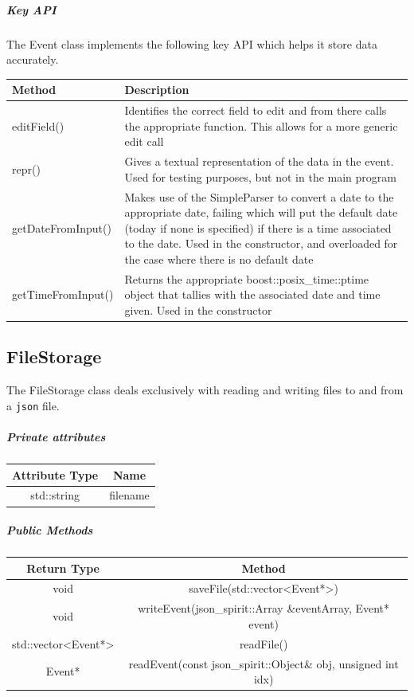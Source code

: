\documentclass[12pt]{extarticle}
\begin{document}
\subparagraph{Key API}
The Event class implements the following key API which helps it store data accurately.\\
\begin{tabular}{p{6cm} p{12cm}}
Method & Description\\
\hline
editField() & Identifies the correct field to edit and from there calls the appropriate function. This allows for a more generic edit call\\
repr() & Gives a textual representation of the data in the event. Used for testing purposes, but not in the main program\\
getDateFromInput() & Makes use of the SimpleParser to convert a date to the appropriate date, failing which will put the default date (today if none is specified) if there is a time associated to the date. Used in the constructor, and overloaded for the case where there is no default date\\
getTimeFromInput() & Returns the appropriate boost::posix\_time::ptime object that tallies with the associated date and time given. Used in the constructor\\
\end{tabular}

\subsection{FileStorage}
The FileStorage class deals exclusively with reading and writing files to and from a \texttt{json} file.
\subparagraph{Private attributes}
\begin{tabular}{c c}
Attribute Type & Name\\
\hline
std::string & filename\\
\end{tabular}

\subparagraph{Public Methods}
\begin{tabular}{c c}
Return Type & Method\\
\hline
void & saveFile(std::vector<Event*>)\\
void & writeEvent(json\_spirit::Array \&eventArray, Event* event)\\
std::vector<Event*> & readFile()\\
Event* & readEvent(const json\_spirit::Object\& obj, unsigned int idx)\\
\end{tabular}
\end{document}
